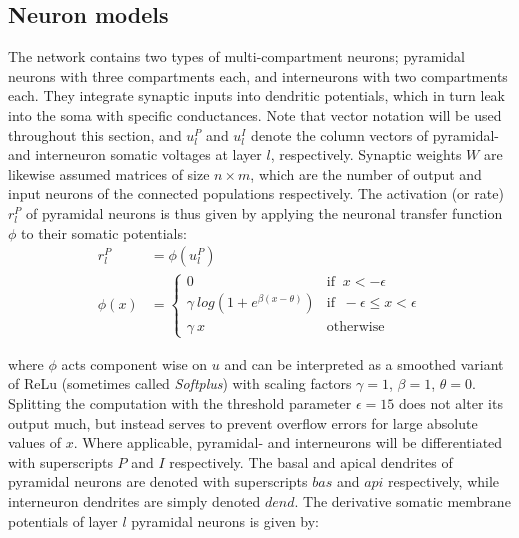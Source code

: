\subsection{Neuron models}\label{sec-neurons}



The network contains two types of multi-compartment neurons; pyramidal neurons with three compartments each, and
interneurons with two compartments each. They integrate synaptic inputs into dendritic potentials, which in turn leak
into the soma with specific conductances. Note that vector notation will be used throughout this section, and $u_l^P$
and $u_l^I$ denote the column vectors of pyramidal- and interneuron somatic voltages at layer $l$, respectively.
Synaptic weights $W$ are likewise assumed matrices of size $n \times m$, which are the number of output and input
neurons of the connected populations respectively. The activation (or rate) $r_l^P$ of pyramidal neurons is thus given
by applying the neuronal transfer function $\phi$ to their somatic potentials:
\begin{align}
  r_l^P   & = \phi(u_l^P)                                                                      \\
  \phi(x) & = \begin{cases}
                0                                   & \textrm{if } \ x < -\epsilon               \\
                \gamma \ log(1+e^{\beta(x-\theta)}) & \textrm{if } \ -\epsilon \leq x < \epsilon \\
                \gamma \ x                          & \textrm{otherwise}
              \end{cases}
\end{align}

where $\phi$ acts component wise on $u$ and can be interpreted as a smoothed variant of ReLu (sometimes called
\textit{Softplus}) with scaling factors $\gamma=1$, $\beta=1$, $\theta=0$. Splitting the computation with the threshold
parameter $\epsilon=15$ does not alter its output much, but instead serves to prevent overflow errors for large absolute
values of $x$.  Where applicable, pyramidal- and interneurons will be differentiated with superscripts $P$ and $I$
respectively. The basal and apical dendrites of pyramidal neurons are denoted with superscripts $bas$ and $api$
respectively, while interneuron dendrites are simply denoted $dend$.  The derivative somatic membrane potentials of
layer $l$ pyramidal neurons is given by:

